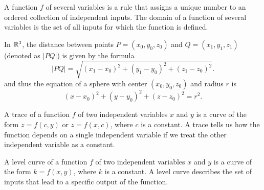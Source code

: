 \begin{summary}
\item A function $f$ of several variables is a rule that assigns a unique number to an ordered collection of independent inputs.  The domain of a function of several variables is the set of all inputs for which the function is defined.
\item In $\mathbb{R}^3$, the distance between points $P=(x_0, y_0, z_0)$ and $Q=(x_1, y_1, z_1)$ (denoted as $|PQ|$)  is given by the formula
\[|PQ| = \sqrt{(x_1-x_0)^2 + (y_1-y_0)^2 + (z_1-z_0)^2}.\]
and thus the equation of a sphere with center $(x_0,y_0,z_0)$ and radius $r$ is
\[(x-x_0)^2 + (y-y_0)^2 + (z-z_0)^2 = r^2.\]
\item A trace of a function $f$ of two independent variables $x$ and $y$ is a curve of the form $z = f(c,y)$ or $z = f(x,c)$, where $c$ is a constant. A trace tells us how the function depends on a single independent variable if we treat the other independent variable as a constant. 
\item A level curve of a function $f$ of two independent variables $x$ and $y$ is a curve of the form $k = f(x,y)$, where $k$ is a constant. A level curve describes the set of inputs that lead to a specific output of the function.
\end{summary}

\nin \hrulefill



\clearpage
